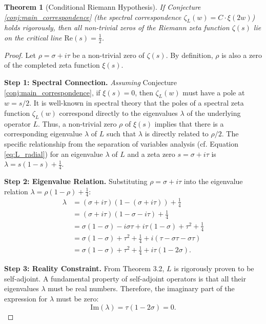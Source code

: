 \documentclass[12pt]{article}
\newtheorem{theorem}{Theorem}[section]
\begin{document}
\begin{theorem}[Conditional Riemann Hypothesis]
\textit{If} Conjecture \ref{conj:main_correspondence} (the spectral correspondence $\zeta_L(w) = C \cdot \xi(2w)$) holds rigorously, \textit{then} all non-trivial zeros of the Riemann zeta function $\zeta(s)$ lie on the critical line $\text{Re}(s) = \frac{1}{2}$.
\end{theorem}
\begin{proof}
Let $\rho = \sigma + i\tau$ be a non-trivial zero of $\zeta(s)$. By definition, $\rho$ is also a zero of the completed zeta function $\xi(s)$.

\textbf{Step 1: Spectral Connection.} \textit{Assuming} Conjecture \ref{conj:main_correspondence}, if $\xi(s) = 0$, then $\zeta_L(w)$ must have a pole at $w = s/2$. It is well-known in spectral theory that the poles of a spectral zeta function $\zeta_L(w)$ correspond directly to the eigenvalues $\lambda$ of the underlying operator $L$. Thus, a non-trivial zero $\rho$ of $\xi(s)$ implies that there is a corresponding eigenvalue $\lambda$ of $L$ such that $\lambda$ is directly related to $\rho/2$. The specific relationship from the separation of variables analysis (cf. Equation \ref{eq:L_radial}) for an eigenvalue $\lambda$ of $L$ and a zeta zero $s = \sigma + i\tau$ is $\lambda = s(1-s) + \frac{1}{4}$.

\textbf{Step 2: Eigenvalue Relation.} Substituting $\rho = \sigma + i\tau$ into the eigenvalue relation $\lambda = \rho(1-\rho) + \frac{1}{4}$:
\begin{align*}
\lambda &= (\sigma + i\tau)(1 - (\sigma + i\tau)) + \frac{1}{4} \\
&= (\sigma + i\tau)(1 - \sigma - i\tau) + \frac{1}{4} \\
&= \sigma(1-\sigma) - i\sigma\tau + i\tau(1-\sigma) + \tau^2 + \frac{1}{4} \\
&= \sigma(1-\sigma) + \tau^2 + \frac{1}{4} + i(\tau - \sigma\tau - \sigma\tau) \\
&= \sigma(1-\sigma) + \tau^2 + \frac{1}{4} + i\tau(1-2\sigma).
\end{align*}

\textbf{Step 3: Reality Constraint.} From Theorem 3.2, $L$ is rigorously proven to be self-adjoint. A fundamental property of self-adjoint operators is that all their eigenvalues $\lambda$ must be real numbers. Therefore, the imaginary part of the expression for $\lambda$ must be zero:
\begin{equation*}
\text{Im}(\lambda) = \tau(1-2\sigma) = 0.
\end{equation*}


\end{proof}
\end{document}
